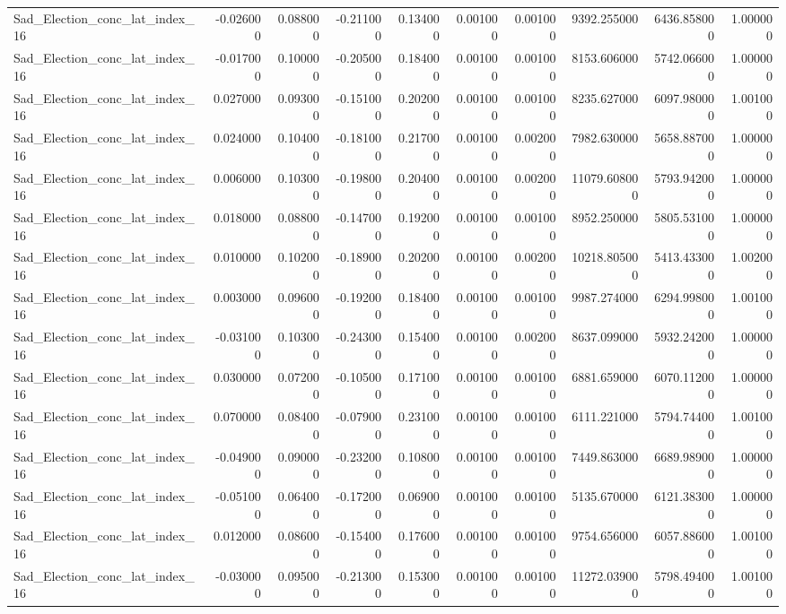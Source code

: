 \begin{table}
\begin{tabular}{lrrrrrrrrr}
Sad_Election_conc_lat_index_16 & -0.026000 & 0.088000 & -0.211000 & 0.134000 & 0.001000 & 0.001000 & 9392.255000 & 6436.858000 & 1.000000 \\
Sad_Election_conc_lat_index_16 & -0.017000 & 0.100000 & -0.205000 & 0.184000 & 0.001000 & 0.001000 & 8153.606000 & 5742.066000 & 1.000000 \\
Sad_Election_conc_lat_index_16 & 0.027000 & 0.093000 & -0.151000 & 0.202000 & 0.001000 & 0.001000 & 8235.627000 & 6097.980000 & 1.001000 \\
Sad_Election_conc_lat_index_16 & 0.024000 & 0.104000 & -0.181000 & 0.217000 & 0.001000 & 0.002000 & 7982.630000 & 5658.887000 & 1.000000 \\
Sad_Election_conc_lat_index_16 & 0.006000 & 0.103000 & -0.198000 & 0.204000 & 0.001000 & 0.002000 & 11079.608000 & 5793.942000 & 1.000000 \\
Sad_Election_conc_lat_index_16 & 0.018000 & 0.088000 & -0.147000 & 0.192000 & 0.001000 & 0.001000 & 8952.250000 & 5805.531000 & 1.000000 \\
Sad_Election_conc_lat_index_16 & 0.010000 & 0.102000 & -0.189000 & 0.202000 & 0.001000 & 0.002000 & 10218.805000 & 5413.433000 & 1.002000 \\
Sad_Election_conc_lat_index_16 & 0.003000 & 0.096000 & -0.192000 & 0.184000 & 0.001000 & 0.001000 & 9987.274000 & 6294.998000 & 1.001000 \\
Sad_Election_conc_lat_index_16 & -0.031000 & 0.103000 & -0.243000 & 0.154000 & 0.001000 & 0.002000 & 8637.099000 & 5932.242000 & 1.000000 \\
Sad_Election_conc_lat_index_16 & 0.030000 & 0.072000 & -0.105000 & 0.171000 & 0.001000 & 0.001000 & 6881.659000 & 6070.112000 & 1.000000 \\
Sad_Election_conc_lat_index_16 & 0.070000 & 0.084000 & -0.079000 & 0.231000 & 0.001000 & 0.001000 & 6111.221000 & 5794.744000 & 1.001000 \\
Sad_Election_conc_lat_index_16 & -0.049000 & 0.090000 & -0.232000 & 0.108000 & 0.001000 & 0.001000 & 7449.863000 & 6689.989000 & 1.000000 \\
Sad_Election_conc_lat_index_16 & -0.051000 & 0.064000 & -0.172000 & 0.069000 & 0.001000 & 0.001000 & 5135.670000 & 6121.383000 & 1.000000 \\
Sad_Election_conc_lat_index_16 & 0.012000 & 0.086000 & -0.154000 & 0.176000 & 0.001000 & 0.001000 & 9754.656000 & 6057.886000 & 1.001000 \\
Sad_Election_conc_lat_index_16 & -0.030000 & 0.095000 & -0.213000 & 0.153000 & 0.001000 & 0.001000 & 11272.039000 & 5798.494000 & 1.001000 \\

\end{tabular}
\end{table}
